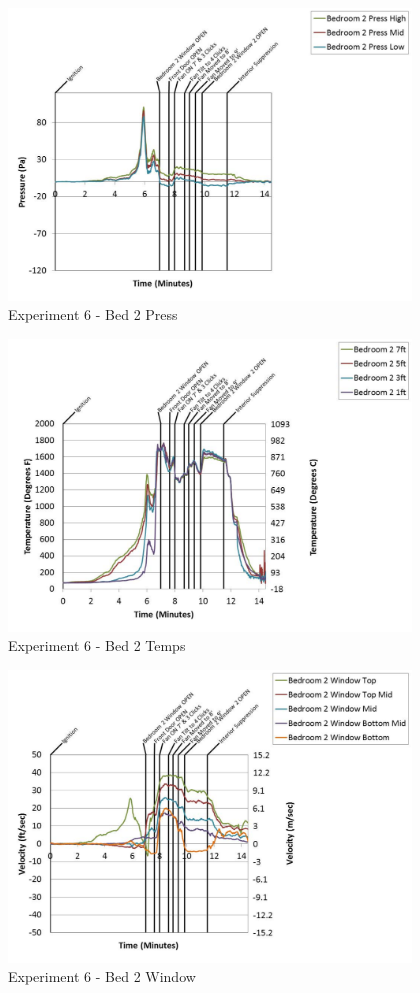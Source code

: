 \documentclass{article}
\begin{document}
\begin{appendices}
	\begin{figure}[h!]
		\centering
		\includegraphics[height=3.05in]{0_Images/Results_Charts/Exp_6_Charts/Bed2Press.pdf}
		\caption{Experiment 6 - Bed 2 Press}
	\end{figure}
 
	\clearpage

	\begin{figure}[h!]
		\centering
		\includegraphics[height=3.05in]{0_Images/Results_Charts/Exp_6_Charts/Bed2Temps.pdf}
		\caption{Experiment 6 - Bed 2 Temps}
	\end{figure}
 

	\begin{figure}[h!]
		\centering
		\includegraphics[height=3.05in]{0_Images/Results_Charts/Exp_6_Charts/Bed2Window.pdf}
		\caption{Experiment 6 - Bed 2 Window}
	\end{figure}
 

\end{appendices}
\end{document}
